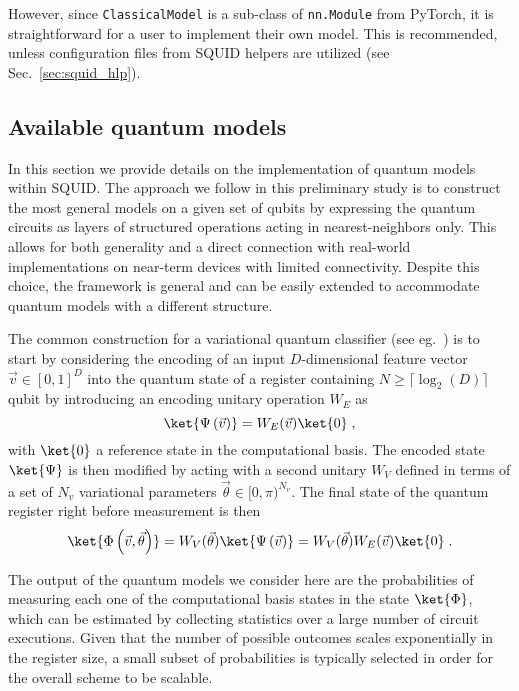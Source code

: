 However, since \texttt{ClassicalModel} is a sub-class of \texttt{nn.Module} from PyTorch, it is straightforward for a user to implement their own model.
This is recommended, unless configuration files from SQUID helpers are utilized (see Sec.~\ref{sec:squid_hlp}).

\subsection{Available quantum models}
\label{sec:qmodels}

In this section we provide details on the implementation of quantum models within SQUID. The approach we follow in this preliminary study is to construct the most general models on a given set of qubits by expressing the quantum circuits as layers of structured operations acting in nearest-neighbors only. This allows for both generality and a direct connection with real-world implementations on near-term devices with limited connectivity. Despite this choice, the framework is general and can be easily extended to accommodate quantum models with a different structure.

The common construction for a variational quantum classifier (see eg.~\cite{Havl_ek_2019,Schuld_2019b,Schuld2020}) is to start by considering the encoding of an input $D$-dimensional feature vector $\vec{v}\in[0,1]^{D}$  into the quantum state of a register containing $N\geq\lceil\log_2(D)\rceil$ qubit by introducing an encoding unitary operation $W_E$ as
\begin{equation}
\ket{\Psi\left(\vec{v}\right)} = W_E(\vec{v})\ket{0}\;,
\end{equation}
with $\ket{0}$ a reference state in the computational basis. The encoded state $\ket{\Psi}$ is then modified by acting with a second unitary $W_V$ defined in terms of a set of $N_v$ variational parameters $\vec{\theta}\in[0,\pi)^{N_v}$. The final state of the quantum register right before measurement is then
\begin{equation}
\label{eq:qfeat}
 \ket{\Phi\left(\vec{v},\vec{\theta}\right)} = W_V(\vec{\theta}) \ket{\Psi\left(\vec{v}\right)} = W_V(\vec{\theta})W_E(\vec{v})\ket{0}\;.
\end{equation}

The output of the quantum models we consider here are the probabilities of measuring each one of the computational basis states in the state $\ket{\Phi}$, which can be estimated by collecting statistics over a large number of circuit executions. Given that the number of possible outcomes scales exponentially in the register size, a small subset of probabilities is typically selected in order for the overall scheme to be scalable.

